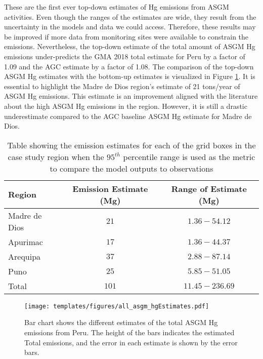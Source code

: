 \begin{flushleft}
    These are the first ever top-down estimates of Hg emissions from ASGM activities.  Even though the ranges of the estimates are wide, they result from the uncertainty in the models and data we could access. Therefore, these results may be improved if more data from monitoring sites were available to constrain the emissions. Nevertheless, the top-down estimate of the total amount of ASGM Hg emissions under-predicts the GMA 2018 total estimate for Peru by a factor of 1.09 and the AGC estimate by a factor of 1.08. The comparison of the top-down ASGM Hg estimates with the bottom-up estimates is visualized in Figure \ref{fig:all_asgm_hgEstimates}. It is essential to highlight the Madre de Dios region's estimate of 21 tons/year of ASGM Hg emissions. This estimate is an improvement aligned with the literature about the high ASGM Hg emissions in the region. However, it is still a drastic underestimate compared to the AGC baseline ASGM Hg estimate for Madre de Dios.
\end{flushleft}    
\begin{table}[H]
\caption{Table showing the emission estimates for each of the grid boxes in the case study region when the $95^{th}$ percentile range is used as the metric to compare the model outputs to observations}
    \label{tab:MCMC_estimates}
\begin{tabular}{lcc}

\textbf{Region}        & \textbf{Emission Estimate (Mg)}  &     \textbf{Range of Estimate (Mg)}                      \\
\hline
Madre de Dios          & $21$                               & $1.36 - 54.12$\\

Apurimac               & $17$                               & $1.36 - 44.37$\\

Arequipa               & $37$                               & $2.88 - 87.14$\\

Puno                    & $25$                              & $5.85 - 51.05$\\
\hline
Total                  & $101$                            &  $11.45 - 236.69$ \\
\hline
\end{tabular}
\centering
\end{table}

\begin{figure}[H]
  \texttt{[image: templates/figures/all\_asgm\_hgEstimates.pdf]}
  \centering
  \caption[Comparison of estimates of total ASGM Hg emissions from Peru ]{Bar chart shows the different estimates  of the total ASGM Hg emissions from Peru. The height of the bars indicates the estimated Total emissions, and the error in each estimate is shown by the error bars.}
  \label{fig:all_asgm_hgEstimates}
\end{figure}
\FloatBarrier


